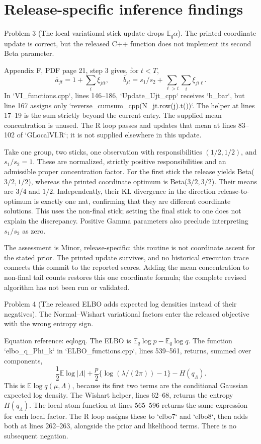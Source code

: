 \documentclass[10pt]{article}
\begin{document}
\section*{Release-specific inference findings}
Problem 3 (The local variational stick update drops \(\mathbb E_q\alpha\)).  The printed coordinate update is correct, but the released C++ function does not implement its second Beta parameter.\par
Appendix F, PDF page 21, step 3 gives, for \(t<T\), \[\bar a_{jt}=1+\sum_i\xi_{jit},\qquad
 \bar b_{jt}=s_1/s_2+\sum_{\ell>t}\sum_i\xi_{ji\ell}.\] In `VI\_functions.cpp`, lines 146–186, `Update\_Ujt\_cpp` receives `b\_bar`, but line 167 assigns only `reverse\_cumsum\_cpp(N\_jt.row(j).t())`. The helper at lines 17–19 is the sum strictly beyond the current entry. The supplied mean concentration is unused. The R loop passes and updates that mean at lines 83–102 of `GLocalVI.R`; it is not supplied elsewhere in this update.\par
Take one group, two sticks, one observation with responsibilities \((1/2,1/2)\), and \(s_1/s_2=1\). These are normalized, strictly positive responsibilities and an admissible proper concentration factor. For the first stick the release yields Beta(\(3/2,1/2\)), whereas the printed coordinate optimum is Beta(\(3/2,3/2\)). Their means are \(3/4\) and \(1/2\). Independently, their KL divergence in the direction release-to-optimum is exactly one nat, confirming that they are different coordinate solutions. This uses the non-final stick; setting the final stick to one does not explain the discrepancy. Positive Gamma parameters also preclude interpreting \(s_1/s_2\) as zero.\par
The assessment is Minor, release-specific: this routine is not coordinate ascent for the stated prior. The printed update survives, and no historical execution trace connects this commit to the reported scores. Adding the mean concentration to non-final tail counts restores this one coordinate formula; the complete revised algorithm has not been run or validated.\par
Problem 4 (The released ELBO adds expected log densities instead of their negatives).  The Normal–Wishart variational factors enter the released objective with the wrong entropy sign.\par
Equation reference: eqlogq. The ELBO is \(\mathbb E_q\log p-\mathbb E_q\log q\). The function `elbo\_q\_Phi\_k` in `ELBO\_functions.cpp`, lines 539–561, returns, summed over components, \[
 \frac12\mathbb E\log|\Lambda|+
 \frac p2\{\log(\lambda/(2\pi))-1\}-H(q_\Lambda).\] This is \(\mathbb E\log q(\mu,\Lambda)\), because its first two terms are the conditional Gaussian expected log density. The Wishart helper, lines 62–68, returns the entropy \(H(q_\Lambda)\). The local-atom function at lines 565–596 returns the same expression for each local factor. The R loop assigns these to `elbo7` and `elbo8`, then adds both at lines 262–263, alongside the prior and likelihood terms. There is no subsequent negation.\par
\end{document}

